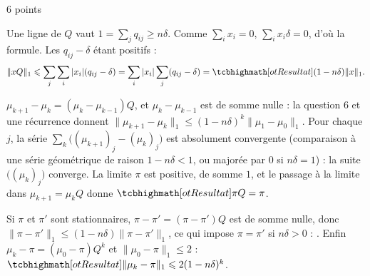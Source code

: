 \begin{corrigeEval}{6 points}{}
\begin{questions}[start=6]
  \item Une ligne de $Q$ vaut $1=\sum_jq_{ij}\geqslant n\delta$. Comme
    $\sum_ix_i=0$, $\sum_ix_i\delta=0$, d'où la formule. Les
    $q_{ij}-\delta$ étant positifs :
    \[\lVert xQ\rVert_1\leqslant\sum_j\sum_i|x_i|(q_{ij}-\delta)=\sum_i|x_i|\sum_j(q_{ij}-\delta)
      =\res{(1-n\delta)\lVert x\rVert_1}.\]
  \item $\mu_{k+1}-\mu_k=(\mu_k-\mu_{k-1})Q$, et $\mu_k-\mu_{k-1}$ est de
    somme nulle : la question 6 et une récurrence donnent
    $\lVert\mu_{k+1}-\mu_k\rVert_1\leqslant(1-n\delta)^{k}\lVert\mu_1-\mu_0\rVert_1$.
    Pour chaque $j$, la série $\sum_k\bigl((\mu_{k+1})_j-(\mu_k)_j\bigr)$ est
    absolument convergente (comparaison à une série géométrique de raison
    $1-n\delta<1$, ou majorée par $0$ si $n\delta=1$) : la suite
    $\bigl((\mu_k)_j\bigr)$ converge. La limite $\pi$ est positive, de somme
    $1$, et le passage à la limite dans $\mu_{k+1}=\mu_kQ$ donne
    $\res{\pi Q=\pi}$. 
  \item Si $\pi$ et $\pi'$ sont stationnaires,
    $\pi-\pi'=(\pi-\pi')Q$ est de somme nulle, donc
    $\lVert\pi-\pi'\rVert_1\leqslant(1-n\delta)\lVert\pi-\pi'\rVert_1$, ce qui
    impose $\pi=\pi'$ si $n\delta>0$ : . Enfin
    $\mu_k-\pi=(\mu_0-\pi)Q^{k}$ et $\lVert\mu_0-\pi\rVert_1\leqslant2$ :
    $\res{\lVert\mu_k-\pi\rVert_1\leqslant2(1-n\delta)^{k}}$. 
\end{questions}
\end{corrigeEval}


